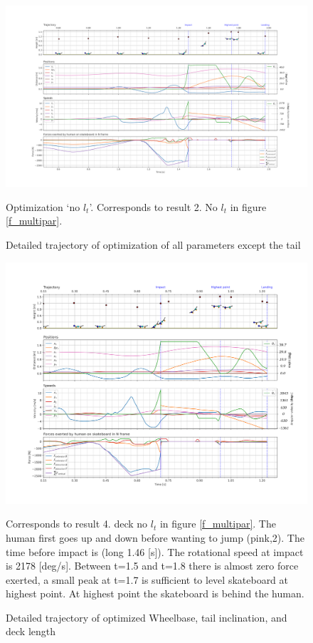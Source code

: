 \documentclass[default,iicol]{sn-jnl}
\begin{document}
\begin{figure}[t]
    \includegraphics[trim={0cm 0cm 0cm 0cm},clip,width=\textwidth]{figure/Results/data_no_taildpi600.png}
    \caption[Trajectory, positions, speeds, and forces for `all except tail length' optimization]{Detailed trajectory of optimization of all parameters except the tail}\label{f_notail}
    Optimization `no $l_t$'. Corresponds to result 2. No $l_t$ in figure \ref{f_multipar}.
    
\end{figure}
\begin{figure}[t]
    \includegraphics[trim={0cm 0cm 0cm 0cm},clip,width=\textwidth]{figure/Results/data_notrrwltdpi600.png}
    \vspace{-0.5cm}\caption[Trajectory, positions, speeds, and forces for `deck except tail length' optimization]{Detailed trajectory of optimized Wheelbase, tail inclination, and deck length}\label{f_notailnotruck}
    Corresponds to result 4. deck no $l_t$ in figure \ref{f_multipar}. The human first goes up and down before wanting to jump (pink,2). The time before impact is (long 1.46 [s]). The rotational speed at impact is 2178 [deg/s]. Between t=1.5 and t=1.8 there is almost zero force exerted, a small peak at t=1.7 is sufficient to level skateboard at highest point. At highest point the skateboard is behind the human.
\end{figure}
\end{document}
